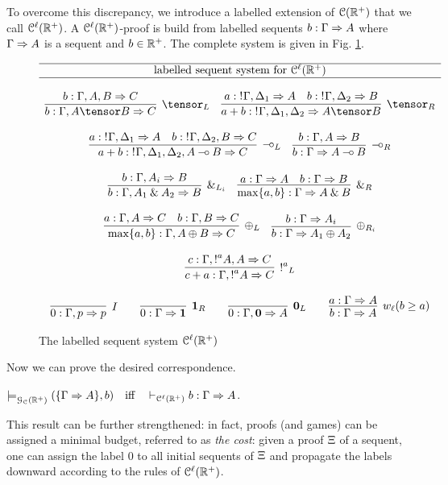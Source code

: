 To overcome this discrepancy, we introduce a  labelled extension of $\mathcal{C}(\mathbb{R}^+)$ that we call $\mathcal{C}^\ell(\mathbb{R}^+)$. A $\mathcal{C}^\ell(\mathbb{R}^+)$-proof is build from labelled sequents $b: \Gamma\Rightarrow A$ where $\Gamma\Rightarrow A$ is a sequent and $b\in\mathbb{R}^+$. The complete system is given in Fig. \ref{fig:lll}. 
\begin{figure}[t]
{
\[
\begin{array}{c}
\hline\mbox{labelled sequent system for }\laIMALLR\\\hline\\
 \infer[\tensor_L]{b: \Gamma, A \tensor B \seq C}
{b: \Gamma, A, B \seq C} 
\quad 
\infer[\tensor_R]{a+b:\nbang{}\Gamma,\Delta_1, \Delta_2 \seq A\tensor B}
{a:\nbang{}\Gamma,\Delta_1 \seq A & b:\nbang{}\Gamma,\Delta_2 \seq B}
\\\\
\infer[\lolli_L]{a+b:\nbang{}\Gamma,\Delta_1, \Delta_2, A \lolli B \seq C}
{a:\nbang{}\Gamma,\Delta_1 \seq A & b:\nbang{}\Gamma,\Delta_2, B \seq C}
\quad 
\infer[\lolli_R]{b:\Gamma \seq A \lolli B}{b:\Gamma, A \seq B}
\\\\
 \infer[\with_{L_i}]{b:\Gamma, A_1 \with A_2 \seq B}
{b:\Gamma, A_i\seq B} 
\quad 
\infer[\with_R]{\max\{a,b\}: \Gamma \seq A \with B}
{a:\Gamma \seq A & b:\Gamma \seq B}
\\\\
\infer[\oplus_L]{\max\{a,b\}:\Gamma, A \oplus B \seq C}
{a:\Gamma, A \seq C & b:\Gamma, B \seq C}
\quad 
\infer[\oplus_{R_i}]{b:\Gamma \seq A_1 \oplus A_2}{b:\Gamma \seq A_i}
\\\\
\infer[\nbang{a}_L]{c+a:\Gamma,\nbang{a}A\seq C}{c:\Gamma,\nbang{a}A,A\seq C}
\\\\
  \infer[I]{0:\Gamma,p \seq p}{} 
 \qquad
\infer[\one_R]{0:\Gamma \seq \one}{}
\qquad 
\infer[\zero_L]{0: \Gamma,\zero\seq A}{}
\qquad 
\infer[w_{\ell} (b\geq a)]{b: \Gamma\seq A}{a:\Gamma\seq A}
\end{array}
\]}\caption{The labelled sequent system $\mathcal{C}^\ell(\mathbb{R}^+)$}
\label{fig:lll}
\end{figure}
Now we can  prove the desired correspondence.
\begin{theorem}
\label{theorem:adeq2}
$\models^{}_{\mathcal{G}_{\mathcal{C}}(\mathbb{R}^+)}(\{\Gamma\Rightarrow A\},b)\quad\mbox{iff}\quad\vdash_{\mathcal{C}^\ell(\mathbb{R}^+)}b: \Gamma\Rightarrow A$. 
\end{theorem}
This result can be further strengthened: in fact, proofs (and games) can be assigned a minimal budget, referred to as {\em the cost}: given a proof $\Xi$ of a sequent, one can assign the label $0$ to all initial sequents of $\Xi$ and propagate the labels downward according to the rules of $\mathcal{C}^\ell(\mathbb{R}^+)$.

